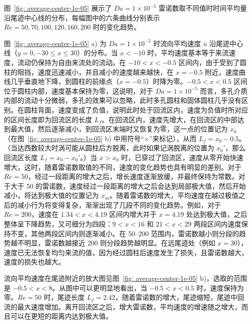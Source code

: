 
图~\ref{fig: average-center-1e-05} 展示了 $Da=1\times 10^{-5}$ 雷诺数取不同值时时间平均量沿尾迹中心线的分布，每幅图中的六条曲线分别表示 $Re=50,70,100,120,160,200$ 时的变化趋势。

图~\ref{fig: average-center-1e-05} a) 为 $Da=1\times 10^{-5}$ 时流向平均速度 $\overline{u}$ 沿尾迹中心线（$y=0, -30\leq x\leq 30$）的分布。当 $x<-10$ 时，平均速度基本等于来流速度，流动仍保持为自由来流处的流动。在 $-10<x<-0.5$ 区间内，由于受到了圆柱的阻挡，速度迅速减小，并且减小的速度越来越快，在 $x=-0.5$ 附近，速度曲线几乎垂直地下降，到圆柱的前缘点（$x=-0.5$）时降为零。$-0.5<x<0.5$ 区间位于圆柱内部，速度基本保持为零，这说明，对于 $Da=1\times 10^{-5}$ 而言，多孔介质内部的流动十分微弱，多孔的效果可以忽略，此时多孔圆柱和固体圆柱几乎没有区别。在圆柱背面，速度变成了负值，说明此时处于回流区内，速度为负值时所对应的区间长度即为回流区的长度 $L_f$。在回流区内，速度先增大，在回流区的中部达到最大值，然后逐渐减小，到回流区末端时又恢复为零，这一点的位置记为 $x_0$（在图~\ref{fig: average-center-1e-05} b) 中用符号“$\times$”来标记），从而 $L_f=x_0-0.5$。（当达西数较大时涡可能从圆柱后方脱离，此时如果记涡脱离的位置为 $x_0'$，那么回流区长度 $L_f=x_0-x_0'$。）当 $x>x_0$ 时，已穿过了回流区，速度从零开始快速增大，这时，随着雷诺数取值的不同，速度的变化趋势也具有明显的差别。对于 $Re=50$，经过一段距离的增大之后，增长速度逐渐放缓，并最终保持为常数。对于大于 50 的雷诺数，速度经过一段距离的增大之后会达到局部极大值，然后开始减小，将达到极大值的位置记为 $x_m$。随着雷诺数的增大，平均速度在越过极值之后的减小行为将变得复杂，渐渐出现了几段不同的变化趋势。例如，对于 $Re=200$，速度在 $1.34<x<4.19$ 区间内增大并于 $x=4.19$ 处达到极大值，之后整体呈下降趋势，又可细分为四段：$9<x<16$ 和 $21<x<29$ 两段区间内速度保持不变，其他两段区间内则逐渐减小。在 50--200 范围内，雷诺数越小则分段的趋势越不明显，雷诺数越接近 200 则分段趋势越明显。在远尾迹处（例如 $x=30$），速度已无法恢复均匀来流的值，因为经过圆柱后速度发生了损失，且雷诺数越大，速度的损失也越大。%

流向平均速度在尾迹附近的放大图见图~\ref{fig: average-center-1e-05} b)，选取的范围是 $-0.5<x<8$。从图中可以更明显地看出，当 $-0.5<x<0.5$ 时，速度保持为零。$Re=50$ 时，尾迹长度 $L_f=2.42$，随着雷诺数的增大，尾迹缩短，尾迹中回流的最大速度增加。离开回流区之后，增大雷诺数，平均速度的增速随之增大，而且可以在更短的距离内达到极大值。

